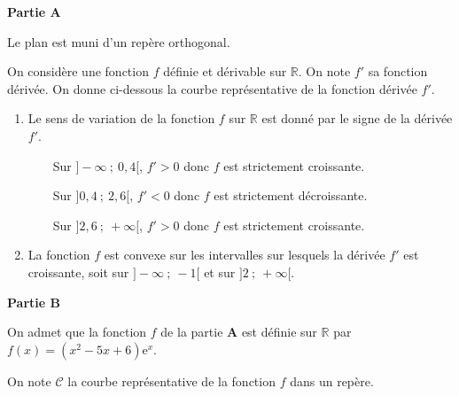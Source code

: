 \medskip

\textbf{\large Partie A}

\medskip

Le plan est muni d'un repère orthogonal.

On considère une fonction $f$ définie et dérivable sur $\mathbb{R}$. On note $f'$ sa fonction dérivée. On donne ci-dessous la courbe représentative de la fonction dérivée $f'$.

\begin{center}
\end{center}





\begin{enumerate}
\item Le sens de variation de la fonction $f$ sur $\mathbb{R}$ est donné par le signe de la dérivée $f'$.

~~\textbullet~~Sur $]-\infty~;~0,4[$, $f'>0$ donc $f$ est strictement croissante.

~~\textbullet~~Sur $]0,4~;~2,6[$, $f'<0$ donc $f$ est strictement décroissante.

~~\textbullet~~Sur $]2,6~;~+\infty[$, $f'>0$ donc $f$ est strictement croissante.

\item La fonction $f$ est convexe sur les intervalles sur lesquels la dérivée $f'$ est croissante, soit sur $]-\infty~;~-1[$ et sur $]2~;~+\infty[$.
\end{enumerate}

\medskip

\textbf{\large Partie B}

\medskip

On admet que la fonction $f$ de la partie $\mathbf{A}$ est définie sur $\mathbb{R}$ par 
$f(x)=\left(x^{2}- 5 x + 6\right) \mathrm{e}^{x}$.

On note $\mathcal{C}$ la courbe représentative de la fonction $f$ dans un repère.



